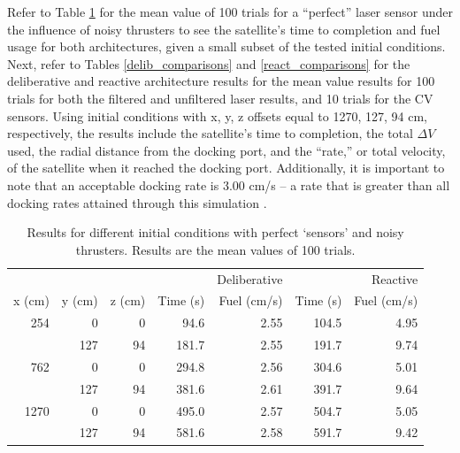 \documentclass[journal, 10pt]{IEEEtran}
\begin{document}
Refer to Table \ref{mean} for the mean value of 100 trials for a ``perfect'' laser sensor under the influence of noisy thrusters to see the satellite's time to completion and fuel usage for both architectures, given a small subset of the tested initial conditions. Next, refer to Tables \ref{delib_comparisons} and \ref{react_comparisons} for the deliberative and reactive architecture results for the mean value results for 100 trials for both the filtered and unfiltered laser results, and 10 trials for the CV sensors. Using initial conditions with x, y, z offsets equal to 1270, 127, 94 cm, respectively, the results include the satellite's time to completion, the total $\Delta V$ used, the radial distance from the docking port, and the ``rate,'' or total velocity, of the satellite when it reached the docking port. Additionally, it is important to note that an acceptable docking rate is 3.00 cm/s -- a rate that is greater than all docking rates attained through this simulation \cite{approachRate}. 

\begin{table}
\centering
\normalsize
\caption{\label{mean}Results for different initial conditions with perfect `sensors' and noisy thrusters. Results are the mean values of 100 trials.}
\begin{tabular}{r r r | r r | r r}
\toprule
     &     &    &          & Deliberative &           & Reactive \\
   x (cm)& y (cm)& z (cm)& Time (s) & Fuel (cm/s) &  Time (s) & Fuel (cm/s) \\
\midrule
254  & 0   & 0  &  94.6 & 2.55 & 104.5 & 4.95 \\
     & 127 & 94 & 181.7 & 2.55 & 191.7 & 9.74 \\
762  & 0   & 0  & 294.8 & 2.56 & 304.6 & 5.01 \\
     & 127 & 94 & 381.6 & 2.61 & 391.7 & 9.64 \\
1270 & 0   & 0  & 495.0 & 2.57 & 504.7 & 5.05 \\
     & 127 & 94 & 581.6 & 2.58 & 591.7 & 9.42 \\
\bottomrule
\end{tabular}
\end{table}
\end{document}
